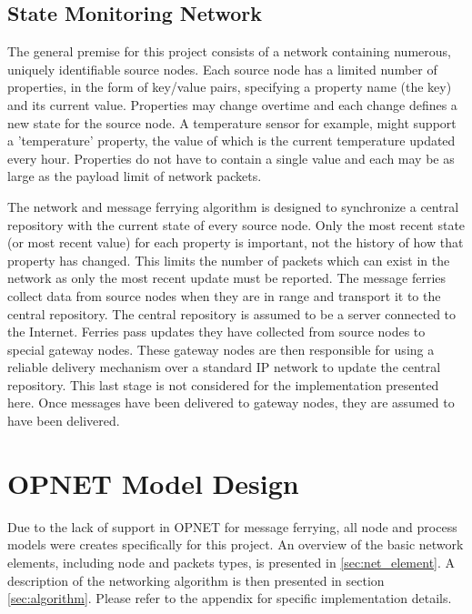 \subsection{State Monitoring Network}

The general premise for this project consists of a network containing numerous, uniquely identifiable source nodes. 
Each source node has a limited number of properties, in the form of key/value pairs, specifying a property name (the key) and its current value.
Properties may change overtime and each change defines a new state for the source node.
A temperature sensor for example, might support a 'temperature' property, the value of which is the current temperature updated every hour.
Properties do not have to contain a single value and each may be as large as the payload limit of network packets. %

The network and message ferrying algorithm is designed to synchronize a central repository with the current state of every source node.
Only the most recent state (or most recent value) for each property is important, not the history of how that property has changed.
This limits the number of packets which can exist in the network as only the most recent update must be reported.
The message ferries collect data from source nodes when they are in range and transport it to the central repository.
The central repository is assumed to be a server connected to the Internet.
Ferries pass updates they have collected from source nodes to special gateway nodes.
These gateway nodes are then responsible for using a reliable delivery mechanism over a standard IP network to update the central repository.
This last stage is not considered for the implementation presented here.
Once messages have been delivered to gateway nodes, they are assumed to have been delivered.

\section{OPNET Model Design}
\label{sec:model_design}

Due to the lack of support in OPNET for message ferrying, all node and process models were creates specifically for this project. 
An overview of the basic network elements, including node and packets types, is presented in \ref{sec:net_element}.
A description of the networking algorithm is then presented in section \ref{sec:algorithm}.
Please refer to the appendix for specific implementation details.

